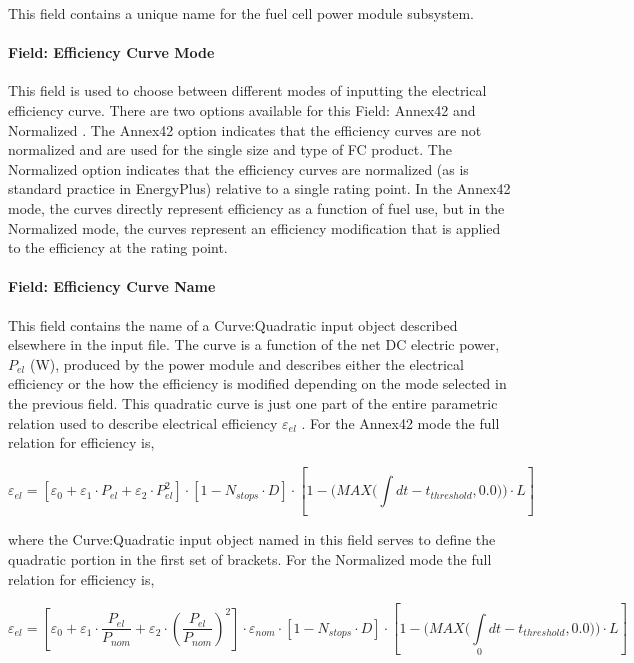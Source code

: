 This field contains a unique name for the fuel cell power module subsystem.

\paragraph{Field: Efficiency Curve Mode}\label{field-efficiency-curve-mode}

This field is used to choose between different modes of inputting the electrical efficiency curve. There are two options available for this Field: Annex42 and Normalized . The Annex42 option indicates that the efficiency curves are not normalized and are used for the single size and type of FC product. The Normalized option indicates that the efficiency curves are normalized (as is standard practice in EnergyPlus) relative to a single rating point. In the Annex42 mode, the curves directly represent efficiency as a function of fuel use, but in the Normalized mode, the curves represent an efficiency modification that is applied to the efficiency at the rating point.

\paragraph{Field: Efficiency Curve Name}\label{field-efficiency-curve-name}

This field contains the name of a Curve:Quadratic input object described elsewhere in the input file. The curve is a function of the net DC electric power, \({P_{el}}\) (W), produced by the power module and describes either the electrical efficiency or the how the efficiency is modified depending on the mode selected in the previous field. This quadratic curve is just one part of the entire parametric relation used to describe electrical efficiency \({\varepsilon_{el}}\) . For the Annex42 mode the full relation for efficiency is,

\begin{equation}
{\varepsilon_{el}} = \left[ {{\varepsilon_0} + {\varepsilon_1} \cdot {P_{el}} + {\varepsilon_2} \cdot P_{el}^2} \right] \cdot \left[ {1 - {N_{stops}} \cdot D} \right] \cdot \left[ {1 - (MAX(\int\limits_{} {dt - {t_{threshold}},0.0))}  \cdot L} \right]
\end{equation}

where the Curve:Quadratic input object named in this field serves to define the quadratic portion in the first set of brackets. For the Normalized mode the full relation for efficiency is,

\begin{equation}
{\varepsilon_{el}} = \left[ {{\varepsilon_0} + {\varepsilon_1} \cdot \frac{{{P_{el}}}}{{{P_{nom}}}} + {\varepsilon_2} \cdot {{\left( {\frac{{{P_{el}}}}{{{P_{nom}}}}} \right)}^2}} \right] \cdot {\varepsilon_{nom}} \cdot \left[ {1 - {N_{stops}} \cdot D} \right] \cdot \left[ {1 - (MAX(\int\limits_0 {dt - {t_{threshold}},0.0))}  \cdot L} \right]
\end{equation}

